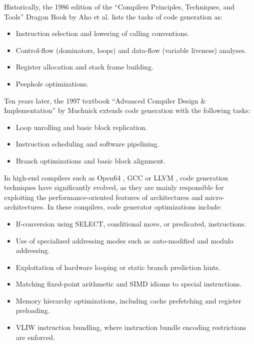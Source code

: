 Historically, the 1986 edition of the ``Compilers Principles, Techniques, and
Tools'' Dragon Book by Aho et al. \cite{Aho:1986:Book} lists the tasks of code generation as:
\begin{itemize}
\item Instruction selection and lowering of calling conventions.
\item Control-flow (dominators, loops) and data-flow (variable liveness) analyses.
\item Register allocation and stack frame building.
\item Peephole optimizations.
\end{itemize}
Ten years later, the 1997 textbook ``Advanced Compiler Design \& Implementation''
by Muchnick \cite{Muchnick:1997:Book} extends code generation with the following tasks: \begin{itemize}
\item Loop unrolling and basic block replication.
\item Instruction scheduling and software pipelining.
\item Branch optimizations and basic block alignment.
\end{itemize}
In high-end compilers such as Open64
\cite{Chan:2008:Tutorial,Chapman:2013:IJPP}, GCC \cite{Stallman:2017:GCC} or
LLVM \cite{Lattner:2004:CGO}, code generation techniques have significantly evolved, as they are mainly responsible
for exploiting the performance-oriented features of architectures and
micro-architectures. In these compilers, code generator optimizations include:
\begin{itemize}
\item If-conversion \cite{chapter:if_conversion} using SELECT, conditional move, or predicated, instructions.
\item Use of specialized addressing modes such as auto-modified and modulo
addressing.
\item Exploitation of hardware looping or static branch prediction hints.
\item Matching fixed-point arithmetic and SIMD idioms to special instructions.
\item Memory hierarchy optimizations, including cache prefetching and register preloading.
\item VLIW instruction bundling, where instruction bundle encoding restrictions are enforced.
\end{itemize}

